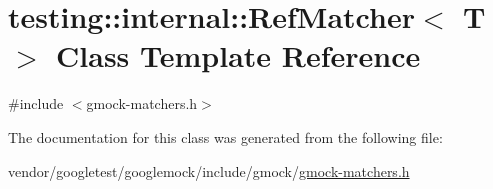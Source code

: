 \hypertarget{classtesting_1_1internal_1_1RefMatcher}{}\section{testing\+:\+:internal\+:\+:Ref\+Matcher$<$ T $>$ Class Template Reference}
\label{classtesting_1_1internal_1_1RefMatcher}


{\ttfamily \#include $<$gmock-\/matchers.\+h$>$}



The documentation for this class was generated from the following file\+:\begin{DoxyCompactItemize}
\item 
vendor/googletest/googlemock/include/gmock/\hyperlink{gmock-matchers_8h}{gmock-\/matchers.\+h}\end{DoxyCompactItemize}
